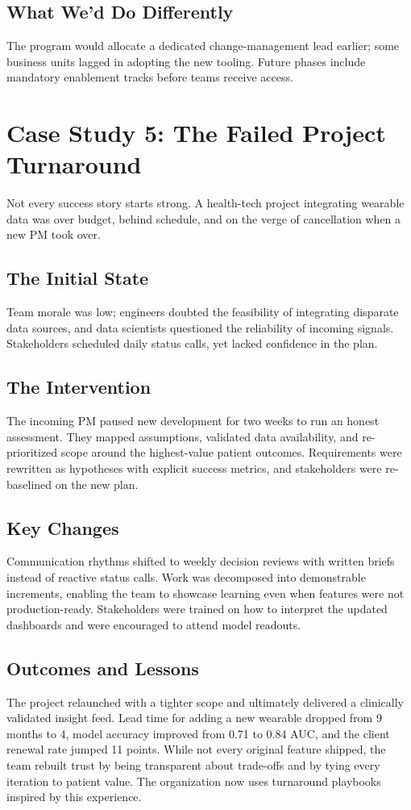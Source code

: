 \subsection{What We'd Do Differently}
The program would allocate a dedicated change-management lead earlier; some business units lagged in adopting the new tooling. Future phases include mandatory enablement tracks before teams receive access.

\section{Case Study 5: The Failed Project Turnaround}
\label{sec:case-turnaround}

Not every success story starts strong. A health-tech project integrating wearable data was over budget, behind schedule, and on the verge of cancellation when a new PM took over.

\subsection{The Initial State}
Team morale was low; engineers doubted the feasibility of integrating disparate data sources, and data scientists questioned the reliability of incoming signals. Stakeholders scheduled daily status calls, yet lacked confidence in the plan.

\subsection{The Intervention}
The incoming PM paused new development for two weeks to run an honest assessment. They mapped assumptions, validated data availability, and re-prioritized scope around the highest-value patient outcomes. Requirements were rewritten as hypotheses with explicit success metrics, and stakeholders were re-baselined on the new plan.

\subsection{Key Changes}
Communication rhythms shifted to weekly decision reviews with written briefs instead of reactive status calls. Work was decomposed into demonstrable increments, enabling the team to showcase learning even when features were not production-ready. Stakeholders were trained on how to interpret the updated dashboards and were encouraged to attend model readouts.

\subsection{Outcomes and Lessons}
The project relaunched with a tighter scope and ultimately delivered a clinically validated insight feed. Lead time for adding a new wearable dropped from 9 months to 4, model accuracy improved from 0.71 to 0.84 AUC, and the client renewal rate jumped 11 points. While not every original feature shipped, the team rebuilt trust by being transparent about trade-offs and by tying every iteration to patient value. The organization now uses turnaround playbooks inspired by this experience.

